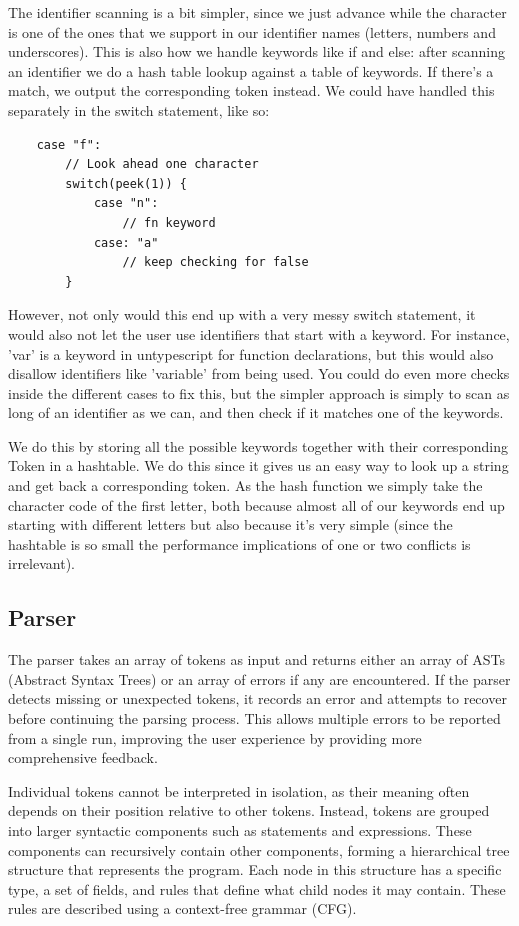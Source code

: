 \documentclass[12pt,a4paper]{article}
\begin{document}
The identifier scanning is a bit simpler, since we just advance while the character is one of the ones that we support in our identifier names (letters, numbers and underscores).
This is also how we handle keywords like if and else: after scanning an identifier we do a hash table lookup against a table of keywords. If there's a match, we output the corresponding token instead. We could have handled this separately in the switch statement, like so:
\begin{lstlisting}
    case "f":
        // Look ahead one character
        switch(peek(1)) {
            case "n":
                // fn keyword
            case: "a"
                // keep checking for false
        } 
\end{lstlisting}

However, not only would this end up with a very messy switch statement, it would also not let the user use identifiers that start with a keyword. For instance, 'var' is a keyword in untypescript for function declarations, but this would also disallow identifiers like 'variable' from being used. You could do even more checks inside the different cases to fix this, but the simpler approach is simply to scan as long of an identifier as we can, and then check if it matches one of the keywords. 

We do this by storing all the possible keywords together with their corresponding Token in a hashtable. We do this since it gives us an easy way to look up a string and get back a corresponding token. 
As the hash function we simply take the character code of the first letter, both because almost all of our keywords end up starting with different letters but also because it's very simple (since the hashtable is so small the performance implications of one or two conflicts is irrelevant).
\newpage
\subsection{Parser}

The parser takes an array of tokens as input and returns either an array of ASTs (Abstract Syntax Trees) or an array of errors if any are encountered. If the parser detects missing or unexpected tokens, it records an error and attempts to recover before continuing the parsing process. This allows multiple errors to be reported from a single run, improving the user experience by providing more comprehensive feedback.

Individual tokens cannot be interpreted in isolation, as their meaning often depends on their position relative to other tokens. Instead, tokens are grouped into larger syntactic components such as statements and expressions. These components can recursively contain other components, forming a hierarchical tree structure that represents the program. Each node in this structure has a specific type, a set of fields, and rules that define what child nodes it may contain. These rules are described using a context-free grammar (CFG).
\end{document}
